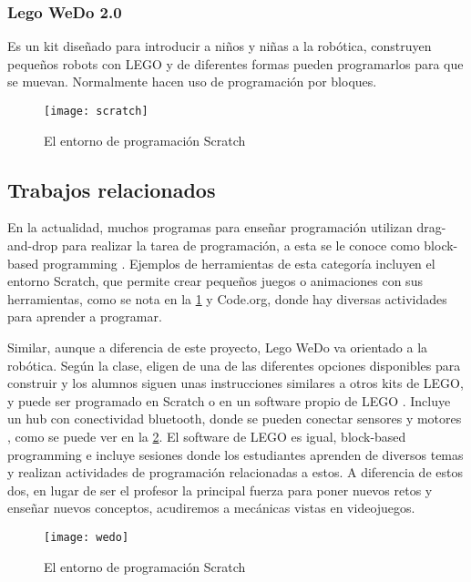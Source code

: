 \subsubsection{Lego WeDo 2.0}
Es un kit diseñado para introducir a niños y niñas a la robótica, 
construyen pequeños robots con LEGO y de diferentes 
formas pueden programarlos para que se muevan. 
Normalmente hacen uso de programación por bloques.

\begin{figure}
    \caption{El entorno de programación Scratch}
    \centering
    \texttt{[image: scratch]}
    \label{fig:scratch_scrn}
\end{figure}

\subsection{Trabajos relacionados}
En la actualidad, muchos programas para enseñar programación utilizan 
drag-and-drop para realizar la tarea de programación, 
a esta se le conoce como block-based programming \cite{block_based_programming}. 
Ejemplos de herramientas de esta categoría incluyen el entorno Scratch, 
que permite crear pequeños juegos o animaciones con sus herramientas, 
como se nota en la \ref{fig:scratch_scrn} y Code.org, donde hay diversas actividades 
para aprender a programar.

Similar, aunque a diferencia de este proyecto, Lego WeDo va orientado a la robótica. Según la clase, eligen de una de las diferentes opciones disponibles para construir y los alumnos siguen unas instrucciones similares a otros kits de LEGO, y puede ser programado en Scratch o en un software propio de LEGO \cite{lego_wedo_explanation}. Incluye un hub con conectividad bluetooth, donde se pueden conectar sensores y motores \cite{lego_wedo_site}, como se puede ver en la \ref{fig:wedo}. El software de LEGO es igual, block-based programming e incluye sesiones donde los estudiantes aprenden de diversos temas y realizan actividades de programación relacionadas a estos. A diferencia de estos dos, en lugar de ser el profesor la principal fuerza para poner nuevos retos y enseñar nuevos conceptos, acudiremos a mecánicas vistas en videojuegos.

\begin{figure}
    \caption{El entorno de programación Scratch}
    \centering
    \texttt{[image: wedo]}
    \label{fig:wedo}
\end{figure}

